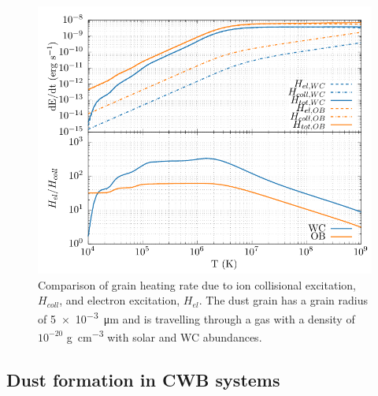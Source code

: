 \begin{figure}[h]
  \centering
  \includegraphics{assets/dust-electron-contribution/coll-el-comp.pdf}
  \caption[$H_{el}$ and $H_{coll}$ comparison]{Comparison of grain heating rate due to ion collisional excitation, $H_{coll}$, and electron excitation, $H_{el}$. The dust grain has a grain radius of \SI{5e-3}{\micro\metre} and is travelling through a gas with a density of $10^{-20}$ \si{\gram\per\centi\metre\cubed} with solar and WC abundances.}
  \label{fig:collisionalheatingcomparison}
\end{figure}

\subsection{Dust formation in CWB systems}
\label{sec:cwbdust}

